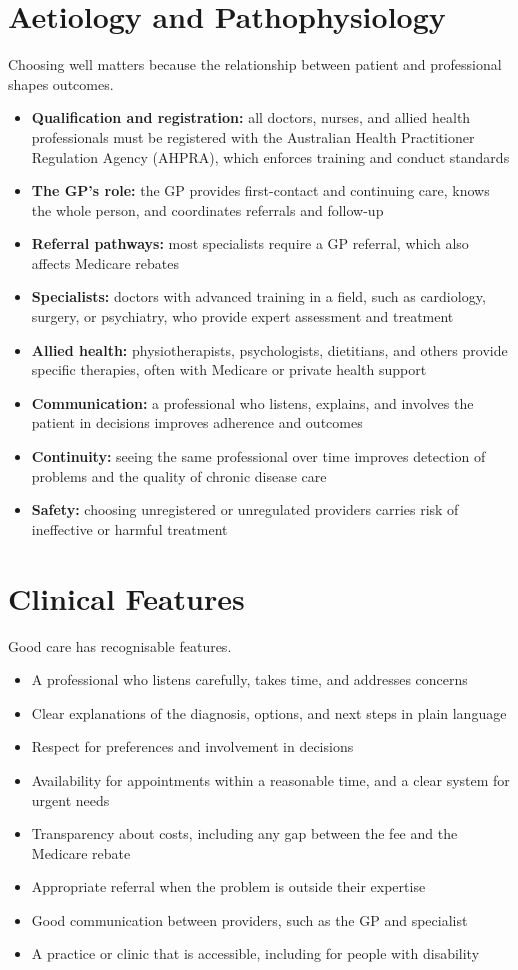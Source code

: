 \section*{Aetiology and Pathophysiology}
Choosing well matters because the relationship between patient and professional shapes outcomes.
\begin{itemize}
    \item \textbf{Qualification and registration:} all doctors, nurses, and allied health professionals must be registered with the Australian Health Practitioner Regulation Agency (AHPRA), which enforces training and conduct standards
    \item \textbf{The GP's role:} the GP provides first-contact and continuing care, knows the whole person, and coordinates referrals and follow-up
    \item \textbf{Referral pathways:} most specialists require a GP referral, which also affects Medicare rebates
    \item \textbf{Specialists:} doctors with advanced training in a field, such as cardiology, surgery, or psychiatry, who provide expert assessment and treatment
    \item \textbf{Allied health:} physiotherapists, psychologists, dietitians, and others provide specific therapies, often with Medicare or private health support
    \item \textbf{Communication:} a professional who listens, explains, and involves the patient in decisions improves adherence and outcomes
    \item \textbf{Continuity:} seeing the same professional over time improves detection of problems and the quality of chronic disease care
    \item \textbf{Safety:} choosing unregistered or unregulated providers carries risk of ineffective or harmful treatment
\end{itemize}

\section*{Clinical Features}
Good care has recognisable features.
\begin{itemize}
    \item A professional who listens carefully, takes time, and addresses concerns
    \item Clear explanations of the diagnosis, options, and next steps in plain language
    \item Respect for preferences and involvement in decisions
    \item Availability for appointments within a reasonable time, and a clear system for urgent needs
    \item Transparency about costs, including any gap between the fee and the Medicare rebate
    \item Appropriate referral when the problem is outside their expertise
    \item Good communication between providers, such as the GP and specialist
    \item A practice or clinic that is accessible, including for people with disability
\end{itemize}

